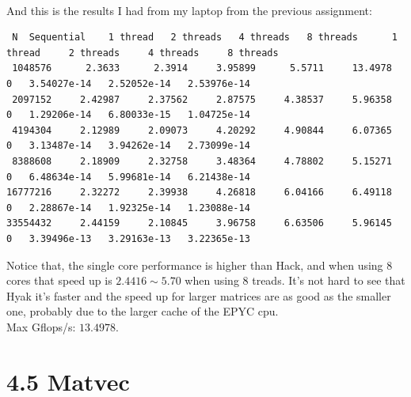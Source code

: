 \documentclass[]{article}
\begin{document}
        \\
        And this is the results I had from my laptop from the previous assignment: 
        \begin{lstlisting}
 N  Sequential    1 thread   2 threads   4 threads   8 threads      1 thread     2 threads     4 threads     8 threads
 1048576      2.3633      2.3914     3.95899      5.5711     13.4978             0   3.54027e-14   2.52052e-14   2.53976e-14
 2097152     2.42987     2.37562     2.87575     4.38537     5.96358             0   1.29206e-14   6.80033e-15   1.04725e-14
 4194304     2.12989     2.09073     4.20292     4.90844     6.07365             0   3.13487e-14   3.94262e-14   2.73099e-14
 8388608     2.18909     2.32758     3.48364     4.78802     5.15271             0   6.48634e-14   5.99681e-14   6.21438e-14
16777216     2.32272     2.39938     4.26818     6.04166     6.49118             0   2.28867e-14   1.92325e-14   1.23088e-14
33554432     2.44159     2.10845     3.96758     6.63506     5.96145             0   3.39496e-13   3.29163e-13   3.22365e-13       
        \end{lstlisting}
        Notice that, the single core performance is higher than Hack, and when using 8 cores that speed up is $2.4416\sim 5.70$ when using 8 treads. It's not hard to see that Hyak it's faster and the speed up for larger matrices are as good as the smaller one, probably due to the larger cache of the EPYC cpu. 
        \\
        Max Gflops/s: $13.4978$. 
\section*{4.5 Matvec}
\end{document}
